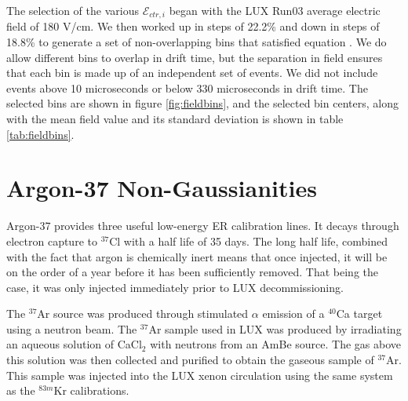 The selection of the various $\mathcal{E}_{ctr,i}$ began with the LUX Run03 average electric field of 180 V/cm. We then worked up in steps of 22.2\% and down in steps of 18.8\% to generate a set of non-overlapping bins that satisfied equation  \label{eq:ebin_e}. We do allow different bins to overlap in drift time, but the separation in field ensures that each bin is made up of an independent set of events. We did not include events above 10 microseconds or below 330 microseconds in drift time. The selected bins are shown in figure \ref{fig:fieldbins}, and the selected bin centers, along with the mean field value and its standard deviation is shown in table \ref{tab:fieldbins}.


\section{Argon-37 Non-Gaussianities}
Argon-37 provides three useful low-energy ER calibration lines. It decays through electron capture to $^{37}$Cl with a half life of 35 days. The long half life, combined with the fact that argon is chemically inert means that once injected, it will be on the order of a year before it has been sufficiently removed. That being the case, it was only injected immediately prior to LUX decommissioning\cite{ar371,pixey_ar37}.

The $^{37}$Ar source was produced through stimulated $\alpha$ emission of a $^{40}$Ca target using a neutron beam. The $^{37}$Ar sample used in LUX was produced by irradiating an aqueous solution of CaCl$_2$ with neutrons from an AmBe source. The gas above this solution was then collected and purified to obtain the gaseous sample of $^{37}$Ar\cite{pixey_ar37}. This sample was injected into the LUX xenon circulation using the same system as the $^{83m}$Kr calibrations\cite{lux_kr2}.

